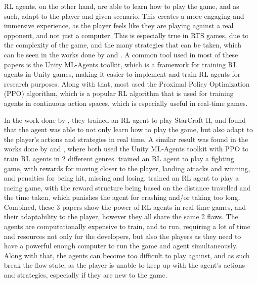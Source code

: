 \documentclass[conference]{IEEEtran}
\begin{document}
RL agents, on the other hand, are able to learn how to play the game, and as such, adapt to the player and given scenario. This creates a more engaging
and immersive experience, as the player feels like they are playing against a real opponent, and not just a computer. This is especially true in RTS games,
due to the complexity of the game, and the many strategies that can be taken, which can be seen in the works done by \cite{vinyals_grandmaster_2019} and \cite{grech_creating_2023}.
A common tool used in most of these papers is the Unity ML-Agents toolkit, which is a framework for training RL agents in Unity games, making it easier to implement and train RL agents for research purposes.
Along with that, most used the Proximal Policy Optimization (PPO) algorithm, which is a popular RL algorithm that is used for training agents in continuous action spaces, which is especially useful in real-time games.

In the work done by \cite{vinyals_grandmaster_2019}, they trained an RL agent to play StarCraft II, and found that the agent was able to not only learn how to play the game, but also adapt to the player's actions and strategies in real time.
A similar result was found in the works done by \cite{bin_ramlan_implementation_2021} and \cite{raut_unity_2024}, where both used the Unity ML-Agents toolkit with PPO to train RL agents in 2 different genres.
\cite{bin_ramlan_implementation_2021} trained an RL agent to play a fighting game, with rewards for moving closer to the player, landing attacks and winning, and penalties for being hit, missing and losing.
\cite{raut_unity_2024} trained an RL agent to play a racing game, with the reward structure being based on the distance travelled and the time taken, which punishes the agent for crashing and/or taking too long.
Combined, these 3 papers show the power of RL agents in real-time games, and their adaptability to the player, however they all share the same 2 flaws. The agents are computationally expensive to train, and to
run, requiring a lot of time and resources not only for the developers, but also the players as they need to have a powerful enough computer to run the game and agent simultaneously. Along with that, the agents
can become too difficult to play against, and as such break the flow state, as the player is unable to keep up with the agent's actions and strategies, especially if they are new to the game.
\end{document}
